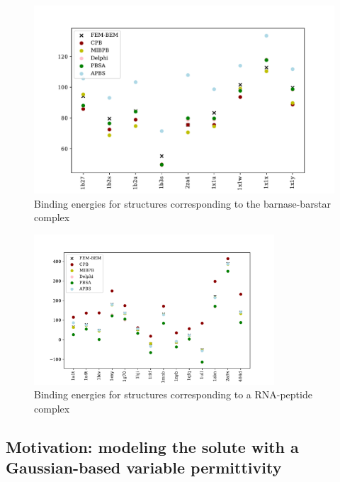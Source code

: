 \begin{figure}
\centering
\includegraphics[width=\textwidth]{binding_energy_barnase-barstar.pdf}
\caption{Binding energies for structures corresponding to the barnase-barstar complex}
\label{fig:barnase_barstar}
\end{figure}

\begin{figure}
\centering
\includegraphics[width=0.8\textwidth]{binding_energy_rna-peptide.pdf}
\caption{Binding energies for structures corresponding to a RNA-peptide complex}
\label{fig:rna_peptide}
\end{figure}


\subsection*{\sffamily \large Motivation: modeling the solute with a Gaussian-based variable permittivity}

